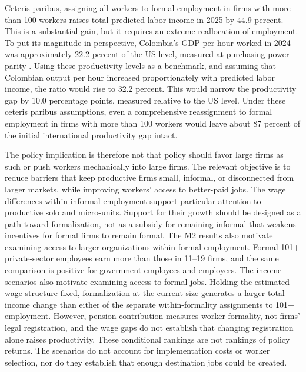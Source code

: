 Ceteris paribus, assigning all workers to formal employment in firms with
more than 100 workers raises total predicted labor income in 2025 by
44.9 percent. This is a substantial gain, but it requires an extreme
reallocation of employment. To put its magnitude in perspective, Colombia's
GDP per hour worked in 2024 was approximately 22.2 percent of the US level,
measured at purchasing power parity \citep{OECD2026Productivity}. Using
these productivity levels as a benchmark, and assuming that Colombian
output per hour increased proportionately with predicted labor income,
the ratio would rise to 32.2 percent. This would narrow the productivity
gap by 10.0 percentage points, measured relative to the US level.
Under these ceteris paribus assumptions, even a comprehensive reassignment
to formal employment in firms with more than 100 workers would leave about 87 percent of the initial international productivity
gap intact.

The policy implication is therefore not that policy should favor large firms
as such or push workers mechanically into large firms. The relevant objective
is to reduce barriers that keep productive firms small, informal, or disconnected
from larger markets, while improving workers' access to better-paid jobs.
The wage differences within informal employment support particular attention
to productive solo and micro-units. Support for their growth should be designed
as a path toward formalization, not as a subsidy for remaining informal that
weakens incentives for formal firms to remain formal. The M2 results
also motivate examining access to larger organizations within formal
employment. Formal 101+ private-sector employees earn more than those in
11--19 firms, and the same comparison is positive for government employees
and employers. The income scenarios also motivate examining
access to formal jobs. Holding the estimated wage structure fixed, formalization at the
current size generates a larger total income change than either of the
separate within-formality assignments to 101+ employment.
However, pension contribution measures worker formality, not firms' legal
registration, and the wage gaps do not establish that changing registration
alone raises productivity. These conditional rankings are not rankings of
policy returns. The scenarios do not account for implementation costs or
worker selection, nor do they establish that enough destination jobs could be created.
